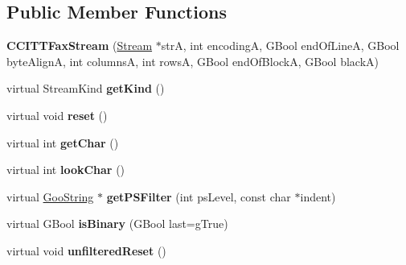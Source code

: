 \subsection*{Public Member Functions}
\begin{DoxyCompactItemize}
\item 
\mbox{\label{class_c_c_i_t_t_fax_stream_ad08cd846545cb452f6de011d83e2d61e}} 
{\bfseries C\+C\+I\+T\+T\+Fax\+Stream} (\hyperlink{class_stream}{Stream} $\ast$strA, int encodingA, G\+Bool end\+Of\+LineA, G\+Bool byte\+AlignA, int columnsA, int rowsA, G\+Bool end\+Of\+BlockA, G\+Bool blackA)
\item 
\mbox{\label{class_c_c_i_t_t_fax_stream_aa5164beb901bf1cc4e4c1056b40475d6}} 
virtual Stream\+Kind {\bfseries get\+Kind} ()
\item 
\mbox{\label{class_c_c_i_t_t_fax_stream_a2e6eafc17bc0101e0a28119731e713eb}} 
virtual void {\bfseries reset} ()
\item 
\mbox{\label{class_c_c_i_t_t_fax_stream_afc1f90e3c49a051343087a0ac5906d2e}} 
virtual int {\bfseries get\+Char} ()
\item 
\mbox{\label{class_c_c_i_t_t_fax_stream_a190d1697419f64ea1e277f71bf5f9e0f}} 
virtual int {\bfseries look\+Char} ()
\item 
\mbox{\label{class_c_c_i_t_t_fax_stream_ad330e397d6bfe40eb21704decac32a15}} 
virtual \hyperlink{class_goo_string}{Goo\+String} $\ast$ {\bfseries get\+P\+S\+Filter} (int ps\+Level, const char $\ast$indent)
\item 
\mbox{\label{class_c_c_i_t_t_fax_stream_a197a0e04b96bb47afdd86d0c5eaf2bc8}} 
virtual G\+Bool {\bfseries is\+Binary} (G\+Bool last=g\+True)
\item 
\mbox{\label{class_c_c_i_t_t_fax_stream_afa9fabd11b453678cfc2cac18f7cda71}} 
virtual void {\bfseries unfiltered\+Reset} ()
\item 
\mbox{\label{class_c_c_i_t_t_fax_stream_a37143319bafd9ef8f43351c42e6d03be}} 

\end{DoxyCompactItemize}

